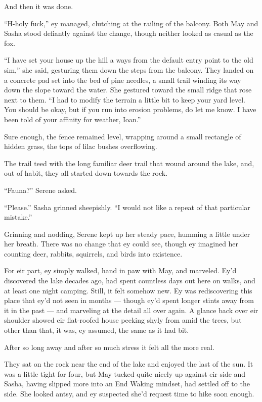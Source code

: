 And then it was done.

``H-holy fuck,'' ey managed, clutching at the railing of the balcony. Both May and Sasha stood defiantly against the change, though neither looked as casual as the fox.

``I have set your house up the hill a ways from the default entry point to the old sim,'' she said, gesturing them down the steps from the balcony. They landed on a concrete pad set into the bed of pine needles, a small trail winding its way down the slope toward the water. She gestured toward the small ridge that rose next to them. ``I had to modify the terrain a little bit to keep your yard level. You should be okay, but if you run into erosion problems, do let me know. I have been told of your affinity for weather, Ioan.''

Sure enough, the fence remained level, wrapping around a small rectangle of hidden grass, the tops of lilac bushes overflowing.

The trail teed with the long familiar deer trail that wound around the lake, and, out of habit, they all started down towards the rock.

``Fauna?'' Serene asked.

``Please.'' Sasha grinned sheepishly. ``I would not like a repeat of that particular mistake.''

Grinning and nodding, Serene kept up her steady pace, humming a little under her breath. There was no change that ey could see, though ey imagined her counting deer, rabbits, squirrels, and birds into existence.

For eir part, ey simply walked, hand in paw with May, and marveled. Ey'd discovered the lake decades ago, had spent countless days out here on walks, and at least one night camping. Still, it felt somehow new. Ey was rediscovering this place that ey'd not seen in months — though ey'd spent longer stints away from it in the past — and marveling at the detail all over again. A glance back over eir shoulder showed eir flat-roofed house peeking shyly from amid the trees, but other than that, it was, ey assumed, the same as it had bit.

After so long away and after so much stress it felt all the more real.

They sat on the rock near the end of the lake and enjoyed the last of the sun. It was a little tight for four, but May tucked quite nicely up against eir side and Sasha, having slipped more into an End Waking mindset, had settled off to the side. She looked antsy, and ey suspected she'd request time to hike soon enough.

